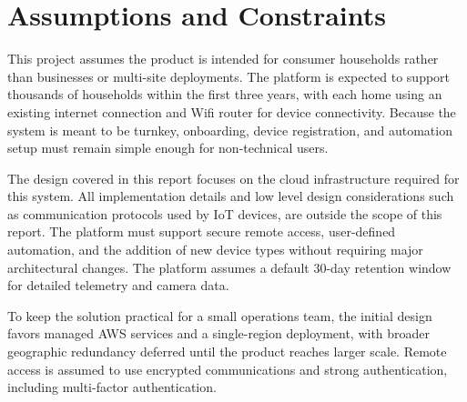 \section{Assumptions and Constraints}

This project assumes the product is intended for consumer households rather than businesses or multi-site deployments. The platform is expected to support thousands of households within the first three years, with each home using an existing internet connection and Wifi router for device connectivity. Because the system is meant to be turnkey, onboarding, device registration, and automation setup must remain simple enough for non-technical users.

The design covered in this report focuses on the cloud infrastructure required for this system. All implementation details and low level design considerations such as communication protocols used by IoT devices, are outside the scope of this report. The platform must support secure remote access, user-defined automation, and the addition of new device types without requiring major architectural changes. The platform assumes a default 30-day retention window for detailed telemetry and camera data.

To keep the solution practical for a small operations team, the initial design favors managed AWS services and a single-region deployment, with broader geographic redundancy deferred until the product reaches larger scale. Remote access is assumed to use encrypted communications and strong authentication, including multi-factor authentication.